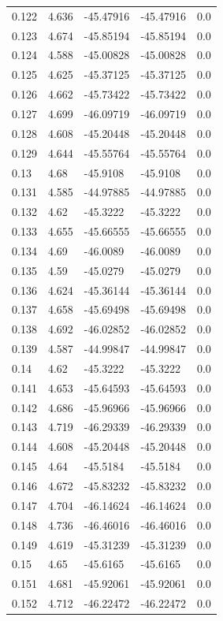 \begin{tabular}{lllll}
0.122 & 4.636 & -45.47916 & -45.47916 & 0.0 \\
0.123 & 4.674 & -45.85194 & -45.85194 & 0.0 \\
0.124 & 4.588 & -45.00828 & -45.00828 & 0.0 \\
0.125 & 4.625 & -45.37125 & -45.37125 & 0.0 \\
0.126 & 4.662 & -45.73422 & -45.73422 & 0.0 \\
0.127 & 4.699 & -46.09719 & -46.09719 & 0.0 \\
0.128 & 4.608 & -45.20448 & -45.20448 & 0.0 \\
0.129 & 4.644 & -45.55764 & -45.55764 & 0.0 \\
0.13 & 4.68 & -45.9108 & -45.9108 & 0.0 \\
0.131 & 4.585 & -44.97885 & -44.97885 & 0.0 \\
0.132 & 4.62 & -45.3222 & -45.3222 & 0.0 \\
0.133 & 4.655 & -45.66555 & -45.66555 & 0.0 \\
0.134 & 4.69 & -46.0089 & -46.0089 & 0.0 \\
0.135 & 4.59 & -45.0279 & -45.0279 & 0.0 \\
0.136 & 4.624 & -45.36144 & -45.36144 & 0.0 \\
0.137 & 4.658 & -45.69498 & -45.69498 & 0.0 \\
0.138 & 4.692 & -46.02852 & -46.02852 & 0.0 \\
0.139 & 4.587 & -44.99847 & -44.99847 & 0.0 \\
0.14 & 4.62 & -45.3222 & -45.3222 & 0.0 \\
0.141 & 4.653 & -45.64593 & -45.64593 & 0.0 \\
0.142 & 4.686 & -45.96966 & -45.96966 & 0.0 \\
0.143 & 4.719 & -46.29339 & -46.29339 & 0.0 \\
0.144 & 4.608 & -45.20448 & -45.20448 & 0.0 \\
0.145 & 4.64 & -45.5184 & -45.5184 & 0.0 \\
0.146 & 4.672 & -45.83232 & -45.83232 & 0.0 \\
0.147 & 4.704 & -46.14624 & -46.14624 & 0.0 \\
0.148 & 4.736 & -46.46016 & -46.46016 & 0.0 \\
0.149 & 4.619 & -45.31239 & -45.31239 & 0.0 \\
0.15 & 4.65 & -45.6165 & -45.6165 & 0.0 \\
0.151 & 4.681 & -45.92061 & -45.92061 & 0.0 \\
0.152 & 4.712 & -46.22472 & -46.22472 & 0.0 \\

\end{tabular}
